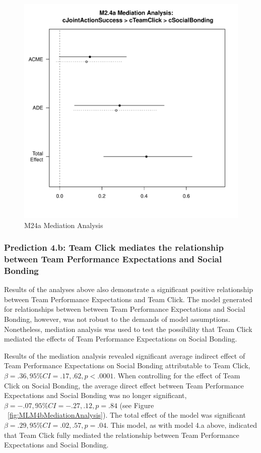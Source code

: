 \begin{CJK}{UTF8}{gbsn}
    \begin{figure}[htbp]
      \centering
      \includegraphics[scale=.5]{images/MLM24aMediationAnalysis.pdf}
      \caption{M24a Mediation Analysis}
      \label{fig:MLM24aMediationAnalysis}
    \end{figure}




\subsubsection{Prediction 4.b: Team Click mediates the relationship between Team Performance Expectations and Social Bonding}

  Results of the analyses above also demonstrate a significant positive relationship between Team Performance Expectations and Team Click. The model generated for relationships between between Team Performance Expectations and Social Bonding, however, was not robust to the demands of model assumptions.   Nonetheless, mediation analysis was used to test the possibility that Team Click mediated the effects of Team Performance Expectations on Social Bonding.

  Results of the mediation analysis revealed significant average indirect effect of Team Performance Expectations on Social Bonding attributable to Team Click, $\beta = .36, 95\% CI = .17 , .62, p < .0001$.  When controlling for the effect of Team Click on Social Bonding, the average direct effect between Team Performance Expectations and Social Bonding was no longer significant, $\beta = -.07, 95\% CI = -.27 , .12, p = .84 $ (see Figure ~\ref{fig:MLM4bMediationAnalysis}). The total effect of the model was significant $\beta = .29, 95\% CI = .02 , .57, p = .04$.  This model, as with model 4.a above, indicated that Team Click fully mediated the relationship between Team Performance Expectations and Social Bonding.



\end{CJK}
